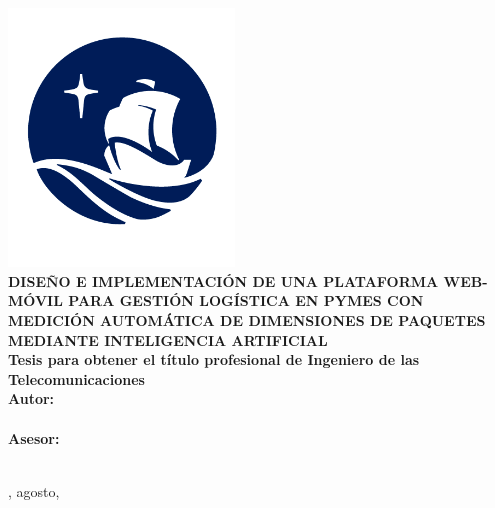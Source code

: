 
\begin{titlepage}
    \centering
    \vspace*{0.5cm}
    
    {\Large\textbf{\universidad}}\\[0.5cm]
    {\Large\textbf{\facultad}}\\
    
    \includegraphics[width=0.45\textwidth]{media/logo_pucp.png}\\[0.5cm]
        
    {\large\textbf{DISEÑO E IMPLEMENTACIÓN DE UNA PLATAFORMA WEB-MÓVIL PARA GESTIÓN LOGÍSTICA EN PYMES CON MEDICIÓN AUTOMÁTICA DE DIMENSIONES DE PAQUETES MEDIANTE INTELIGENCIA ARTIFICIAL}}\\[0.5cm]
    
    {\large\textbf{ Tesis para obtener el título profesional de Ingeniero de las Telecomunicaciones}}\\[1cm]
    
    {\large \textbf{Autor:}}\\[0.3cm]
    {\large \autor}\\[1cm]
    
    {\large \textbf{Asesor:}}\\[0.3cm]
    {\large \asesor}\\[2cm]
    
    \vfill
    
    {\large \ciudad, agosto, \anio}
\end{titlepage}